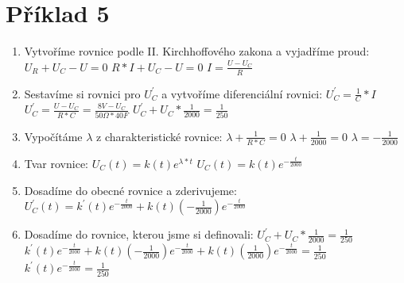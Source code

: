 \section{Příklad 5}

\begin{enumerate}

    \item Vytvoříme rovnice podle II. Kirchhoffového zakona a vyjadříme proud:\newline
    $U_R + U_C - U = 0$\newline
    $R * I + U_C -U = 0$\newline
    $I = \frac{U - U_C}{R}$\newline
    \item Sestavíme si rovnici pro $U_{C}^{'}$ a vytvoříme diferenciální rovnici:\newline
    $U_{C}^{'} = \frac{1}{C} * I$\newline
    $U_{C}^{'} = \frac{U - U_C}{R * C} = \frac{8V - U_C}{50\Omega * 40F}$\newline
    $U_{C}^{'} + U_C * \frac{1}{2000} = \frac{1}{250}$\newline
    \item Vypočítáme $\lambda$ z charakteristické rovnice:\newline
    $\lambda + \frac{1}{R * C} = 0$\newline
    $\lambda + \frac{1}{2000} = 0$\newline
    $\lambda = - \frac{1}{2000}$\newline
    \item Tvar rovnice:\newline
    $U_C(t) = k(t)e^{\lambda * t}$\newline
    $U_C(t) = k(t)e^{-\frac{t}{2000}}$\newline
    \item Dosadíme do obecné rovnice a zderivujeme:\newline
    $U_{C}^{'}(t) = k^{'}(t)e^{-\frac{t}{2000}} + k(t)(-\frac{1}{2000})e^{-\frac{t}{2000}}$\newline
    \item Dosadíme do rovnice, kterou jsme si definovali:\newline
    $U_{C}^{'} + U_C * \frac{1}{2000} = \frac{1}{250}$\newline
    $k^{'}(t)e^{-\frac{t}{2000}} + k(t)(-\frac{1}{2000})e^{-\frac{t}{2000}} + k(t)(\frac{1}{2000})e^{-\frac{t}{2000}} = \frac{1}{250}$\newline
    $k^{'}(t)e^{-\frac{t}{2000}} = \frac{1}{250}$\newline

\end{enumerate}
